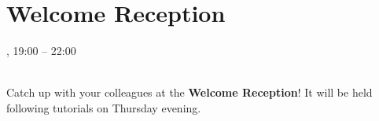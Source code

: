 \section[Welcome Reception]{Welcome Reception}
\setheaders{}{\daydateyear}

\begin{center}



\daydateyear, 19:00 -- 22:00 \vspace{1em}\\
\WelcomeReceptionLoc\\
\end{center}

\noindent Catch up with your colleagues at the \textbf{Welcome
Reception}! It will be held following tutorials on Thursday evening.